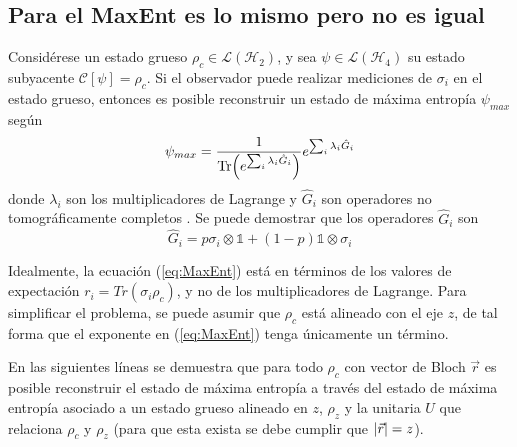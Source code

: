 \documentclass[onecolumn,11pt]{article}
\newcommand{\mcL}{\mathcal{L}}
\newcommand{\mcH}{\mathcal{H}}
\newcommand{\mcC}{\mathcal{C}}
\newcommand{\Id}{\mathds{1}}%
\newcommand{\CG}[1]{\mcC\left[#1\right]}
\begin{document}
\subsection{Para el MaxEnt es lo mismo pero no es igual}
Considérese un estado grueso $\rho_{c}\in \mcL(\mcH_{2})$, y sea $\psi\in\mcL(\mcH_{4})$ su estado subyacente $\CG{\psi}=\rho_{c}$. Si el observador puede realizar mediciones de $\sigma_{i}$ en el estado grueso, entonces es posible reconstruir un estado de máxima entropía $\psi_{max}$ según
\begin{equation}\label{eq:MaxEnt}
\psi_{max}=\frac{1}{\Tr(e^{\sum_{i}\lambda_{i}\hat{G}_{i}})}e^{\sum_{i}\lambda_{i}\hat{G}_{i}}
\end{equation}
donde $\lambda_{i}$ son los multiplicadores de Lagrange y $\hat{G}_{i}$ son operadores no tomográficamente completos \cite{MaxEnt}. Se puede demostrar que los operadores $\hat{G}_{i}$ son
\begin{equation}\label{eq:Gop}
\hat{G}_{i}=p\sigma_{i}\otimes\Id+(1-p)\Id\otimes\sigma_{i}
\end{equation}

Idealmente, la ecuación (\ref{eq:MaxEnt}) está en términos de los valores de expectación $r_{i}=Tr(\sigma_{i}\rho_{c})$, y no de los multiplicadores de Lagrange. Para simplificar el problema, se puede asumir que $\rho_{c}$ está alineado con el eje $z$, de tal forma que el exponente en (\ref{eq:MaxEnt}) tenga únicamente un término.

\vspace{0.2cm}

En las siguientes líneas se demuestra que para todo $\rho_{c}$ con vector de Bloch $\vec{r}$ es posible reconstruir el estado de máxima entropía a través del estado de máxima entropía asociado a un estado grueso alineado en $z$, $\rho_{z}$ y la unitaria $U$ que relaciona $\rho_{c}$ y $\rho_{z}$ (para que esta exista se debe cumplir que $\abs{\vec{r}}=z$).

\vspace{0.2cm}
\end{document}

